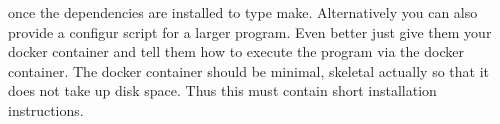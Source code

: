 \begin{description}
        once the dependencies are installed to type make. Alternatively                                                                                               
        you can also provide a configur script for a larger program.                                                                                                  
        Even better just give them your docker container and tell them                                                                                                
        how to execute the program via the docker container. The docker                                                                                                
        container should be minimal, skeletal actually so that it does                                                                                                
        not take up disk space. Thus this must contain short installation                                                                                              
        instructions.   
\end{description}
